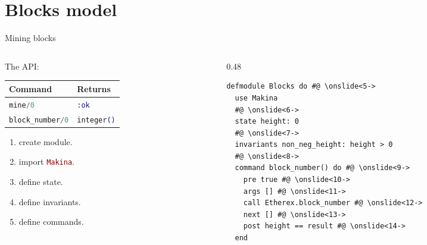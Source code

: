 \documentclass[aspectratio=169, 10pt, handout]{beamer}
\begin{document}
\section{Blocks model}
\label{sec:org992239e}
\begin{frame}[label={sec:org16c17cf},fragile]{Mining blocks}
 \begin{columns}
\begin{column}{0.48\columnwidth}
\onslide<+->
\onslide<+->
The API:
\onslide<+->
\begin{center}
\begin{tabular}{ll}
Command & Returns\\
\hline
\lstinline[language=elixir, style=display]~mine/0~ & \lstinline[language=elixir, style=display]~:ok~\\
\lstinline[language=elixir, style=display]~block_number/0~ & \lstinline[language=elixir, style=display]~integer()~\\
\end{tabular}
\end{center}
\onslide<+->
\vspace{10pt}
\begin{enumerate}
\item create module.
\onslide<+->
\item import \lstinline[language=elixir, style=display]~Makina~.
\onslide<+->
\item define state.
\onslide<+->
\item define invariants.
\onslide<+->
\item define commands.
\end{enumerate}
\end{column}

\begin{column}{0.48\columnwidth}
\lstset{language=elixir,label= ,caption= ,captionpos=b,numbers=none,style=display}
\begin{lstlisting}
defmodule Blocks do #@ \onslide<5->
  use Makina
  #@ \onslide<6->
  state height: 0
  #@ \onslide<7->
  invariants non_neg_height: height > 0
  #@ \onslide<8->
  command block_number() do #@ \onslide<9->
    pre true #@ \onslide<10->
    args [] #@ \onslide<11->
    call Etherex.block_number #@ \onslide<12->
    next [] #@ \onslide<13->
    post height == result #@ \onslide<14->
  end
\end{lstlisting}
\end{column}
\end{columns}
\end{frame}
\end{document}
